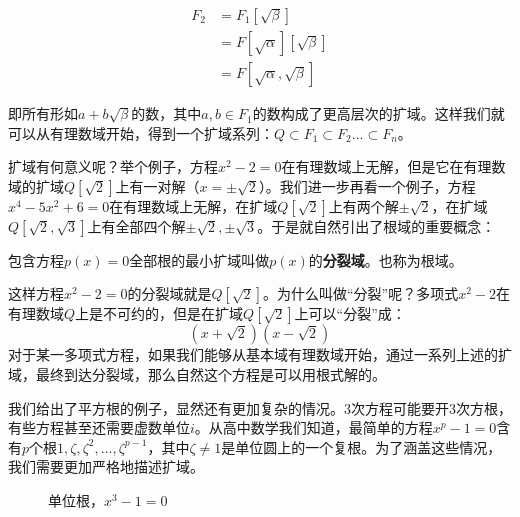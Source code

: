 \documentclass{article}
\begin{document}
\[
\begin{array}{rl}
F_2 & = F_1[\sqrt{\beta}] \\
    & = F[\sqrt{\alpha}][\sqrt{\beta}] \\
    & = F[\sqrt{\alpha}, \sqrt{\beta}]
\end{array}
\]

即所有形如$a + b \sqrt{\beta}$的数，其中$a, b \in F_1$的数构成了更高层次的扩域。这样我们就可以从有理数域开始，得到一个扩域系列：$Q \subset F_1 \subset F_2 ... \subset F_n$。

扩域有何意义呢？举个例子，方程$x^2 - 2 = 0$在有理数域上无解，但是它在有理数域的扩域$Q[\sqrt{2}]$上有一对解（$x = \pm \sqrt{2}$）。我们进一步再看一个例子，方程$x^4 - 5x^2 + 6 = 0$在有理数域上无解，在扩域$Q[\sqrt{2}]$上有两个解$\pm \sqrt{2}$，在扩域$Q[\sqrt{2}, \sqrt{3}]$上有全部四个解$\pm \sqrt{2}, \pm \sqrt{3}$。于是就自然引出了根域的重要概念：

 
\begin{definition}
包含方程$p(x) = 0$全部根的最小扩域叫做$p(x)$的\textbf{分裂域}。也称为根域。
\end{definition}

这样方程$x^2 -2 = 0$的分裂域就是$Q[\sqrt{2}]$。为什么叫做“分裂”呢？多项式$x^2-2$在有理数域$Q$上是不可约的，但是在扩域$Q[\sqrt{2}]$上可以“分裂”成：
\[
(x + \sqrt{2}) (x - \sqrt{2})
\]
对于某一多项式方程，如果我们能够从基本域有理数域开始，通过一系列上述的扩域，最终到达分裂域，那么自然这个方程是可以用根式解的。

我们给出了平方根的例子，显然还有更加复杂的情况。3次方程可能要开3次方根，有些方程甚至还需要虚数单位$i$。从高中数学我们知道，最简单的方程$x^p-1=0$含有$p$个根$1, \zeta, \zeta^2, ..., \zeta^{p-1}$，其中$\zeta \neq 1$是单位圆上的一个复根。为了涵盖这些情况，我们需要更加严格地描述扩域。

\begin{figure}[htbp]
\centering
{}
\caption{单位根，$x^3 - 1 = 0$}
\label{fig:root-of-unity}
\end{figure}
\end{document}
